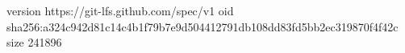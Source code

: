 version https://git-lfs.github.com/spec/v1
oid sha256:a324c942d81c14c4b1f79b7e9d504412791db108dd83fd5bb2ec319870f4f42c
size 241896
